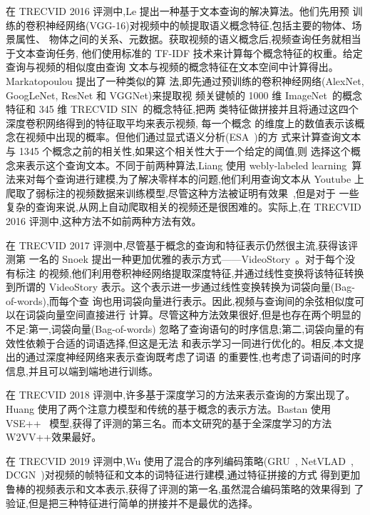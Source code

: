 在 TRECVID 2016 评测中,Le \etal\cite{le2016nii}提出一种基于文本查询的解决算法。他们先用预
训练的卷积神经网络(VGG-16)对视频中的帧提取语义概念特征,包括主要的物体、场景属性、
物体之间的关系、元数据。获取视频的语义概念后,视频查询任务就相当于文本查询任务,
他们使用标准的 TF-IDF 技术来计算每个概念特征的权重。给定查询与视频的相似度由查询
文本与视频的概念特征在文本空间中计算得出。Markatopoulou \etal\cite{foteini2016iti}提出了一种类似的算
法,即先通过预训练的卷积神经网络(AlexNet, GoogLeNet, ResNet 和 VGGNet)来提取视
频关键帧的 1000 维 ImageNet~\cite{russakovsky2015imagenet}的概念特征和 345 维 TRECVID SIN~\cite{smeaton2009high}的概念特征,把两
类特征做拼接并且将通过这四个深度卷积网络得到的特征取平均来表示视频, 每一个概念
的维度上的数值表示该概念在视频中出现的概率。但他们通过显式语义分析(ESA~\cite{gabrilovich2007computing})的方
式来计算查询文本与 1345 个概念之前的相关性,如果这个相关性大于一个给定的阈值,则
选择这个概念来表示这个查询文本。不同于前两种算法,Liang \etal\cite{liang2016inf}使用 webly-labeled
learning~\cite{liang2016learning}算法来对每个查询进行建模,为了解决零样本的问题,他们利用查询文本从
Youtube 上爬取了弱标注的视频数据来训练模型,尽管这种方法被证明有效果~\cite{kordumova2015best},但是对于
一些复杂的查询来说,从网上自动爬取相关的视频还是很困难的。实际上,在 TRECVID 2016
评测中,这种方法不如前两种方法有效。

在 TRECVID 2017 评测中,尽管基于概念的查询和特征表示仍然很主流,获得该评测第
一名的 Snoek \etal\cite{snoek2017university}提出一种更加优雅的表示方式——VideoStory~\cite{habibian2014videostory}。对于每个没有标注
的视频,他们利用卷积神经网络提取深度特征,并通过线性变换将该特征转换到所谓的
VideoStory 表示。这个表示进一步通过线性变换转换为词袋向量(Bag-of-words),而每个查
询也用词袋向量进行表示。因此,视频与查询间的余弦相似度可以在词袋向量空间直接进行
计算。尽管这种方法效果很好,但是也存在两个明显的不足:第一,词袋向量(Bag-of-words)
忽略了查询语句的时序信息;第二,词袋向量的有效性依赖于合适的词语选择,但这是无法
和表示学习一同进行优化的。相反,本文提出的通过深度神经网络来表示查询既考虑了词语
的重要性,也考虑了词语间的时序信息,并且可以端到端地进行训练。

在 TRECVID 2018 评测中,许多基于深度学习的方法来表示查询的方案出现了。Huang \etal\cite{huang2018informedia}使用了两个注意力模型和传统的基于概念的表示方法。Bastan \etal\cite{bastan2018ntu}使用 VSE++~\cite{faghri2017vse++}
模型,获得了评测的第三名。而本文研究的基于全深度学习的方法 W2VV++效果最好。

在 TRECVID 2019 评测中,Wu \etal\cite{wu2019hybrid}使用了混合的序列编码策略(GRU~\cite{cho2014learning},
NetVLAD~\cite{arandjelovic2016netvlad}, DCGN~\cite{mao2018hierarchical})对视频的帧特征和文本的词特征进行建模,通过特征拼接的方式
得到更加鲁棒的视频表示和文本表示,获得了评测的第一名,虽然混合编码策略的效果得到
了验证,但是把三种特征进行简单的拼接并不是最优的选择。

